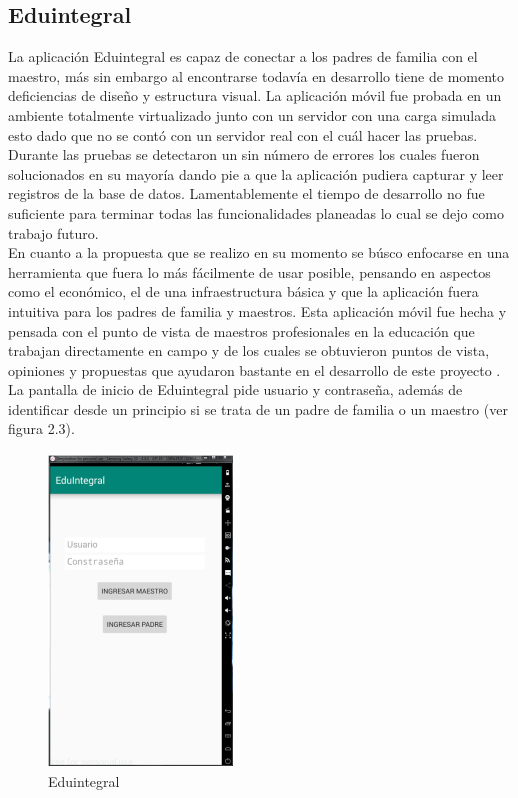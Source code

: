         \subsection{Eduintegral}

            La aplicación Eduintegral \cite{eduintegral} es capaz de conectar a los padres de familia con el maestro, más sin embargo al encontrarse todavía en desarrollo tiene de momento deficiencias de diseño y estructura visual. La aplicación móvil fue probada en un ambiente totalmente virtualizado junto con un servidor con una carga simulada esto dado que no se contó con un servidor real con el cuál hacer las pruebas. \\ Durante las pruebas se detectaron un sin número de errores los cuales fueron solucionados en su mayoría dando pie a que la aplicación pudiera capturar y leer registros de la base de datos. Lamentablemente el tiempo de desarrollo no fue suficiente para terminar todas las funcionalidades planeadas lo cual se dejo como trabajo futuro. \\ En cuanto a la propuesta que se realizo en su momento se búsco enfocarse en una herramienta que fuera lo más fácilmente de usar posible, pensando en aspectos como el económico, el de una infraestructura básica y que la aplicación fuera intuitiva para los padres de familia y maestros. Esta aplicación móvil fue hecha y pensada con el punto de vista de maestros profesionales en la educación que trabajan directamente en campo y de los cuales se obtuvieron puntos de vista, opiniones y propuestas que ayudaron bastante en el desarrollo de este proyecto \cite{eduintegral}. La pantalla de inicio de Eduintegral pide usuario y contraseña, además de identificar desde un principio si se trata de un padre de familia o un maestro (ver figura 2.3). 
            
            \begin{figure}[H]
                \centering
                \includegraphics[scale=0.9]{Propuesta_Plantilla_Tesis_LaTeX_UAG/imagenes/eduintegral.png}
                \caption{Eduintegral}
                \label{fig:eduintegral}
            \end{figure}


